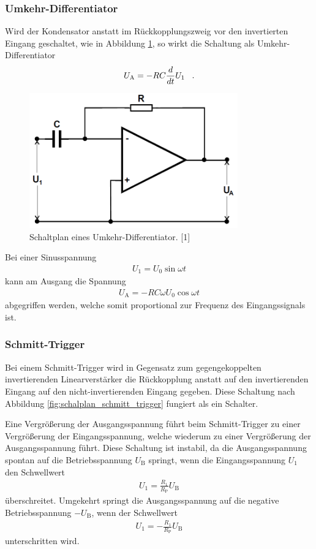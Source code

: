 \documentclass[]{scrartcl}
\begin{document}
\subsubsection{Umkehr-Differentiator}
Wird der Kondensator anstatt im Rückkopplungszweig vor den invertierten Eingang geschaltet, wie in Abbildung \ref{fig:schalplan_umkehrdifferentiator}, so wirkt die Schaltung als Umkehr-Differentiator
\begin{align}
U_\text{A}= -RC \frac{d}{d t} U_1 \hspace{0.3cm}\text{.}
\end{align}
\begin{figure}[H]
\centering
\includegraphics[width=9cm]{images/schaltplan_umkehrdifferentiator.png}
\caption{Schaltplan eines Umkehr-Differentiator. [1]}
\label{fig:schalplan_umkehrdifferentiator}
\end{figure}
Bei einer Sinusspannung
\begin{align}
U_1=U_0 \sin \omega t
\end{align}
kann am Ausgang die Spannung
\begin{align}
U_\text{A} = -RC\omega U_0 \cos \omega t
\end{align}
abgegriffen werden, welche somit proportional zur Frequenz des Eingangssignals ist.
\subsubsection{Schmitt-Trigger}
Bei einem Schmitt-Trigger wird in Gegensatz zum gegengekoppelten invertierenden Linearverstärker die Rückkopplung anstatt auf den invertierenden Eingang auf den nicht-invertierenden Eingang gegeben. Diese Schaltung nach Abbildung \ref{fig:schalplan_schmitt_trigger} fungiert als ein Schalter.

Eine Vergrößerung der Ausgangsspannung führt beim Schmitt-Trigger zu einer Vergrößerung der Eingangsspannung, welche wiederum zu einer Vergrößerung der Ausgangsspannung führt. Diese Schaltung ist instabil, da die Ausgangsspannung spontan auf die Betriebsspannung $U_\text{B}$ springt, wenn die Eingangsspannung $U_1$ den Schwellwert
\begin{align}
U_1=\frac{R_1}{R_\text{P}}U_\text{B}
\end{align} 
überschreitet. Umgekehrt springt die Ausgangsspannung auf die negative Betriebsspannung $-U_\text{B}$, wenn der Schwellwert
\begin{align}
U_1=-\frac{R_1}{R_\text{P}}U_\text{B}
\end{align}
unterschritten wird.
\end{document}
